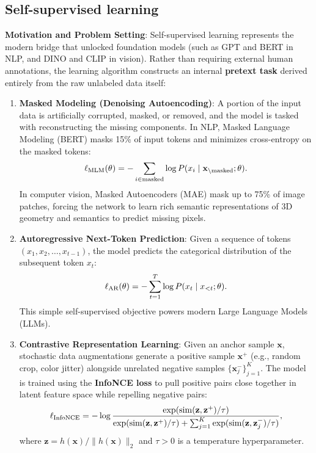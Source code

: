 \subsection{Self-supervised learning}
\label{sec:self_supervised_learning}

\textbf{Motivation and Problem Setting}: Self-supervised learning represents the modern bridge that unlocked foundation models (such as GPT and BERT in NLP, and DINO and CLIP in vision). Rather than requiring external human annotations, the learning algorithm constructs an internal \textbf{pretext task} derived entirely from the raw unlabeled data itself:
\begin{enumerate}
  \item \textbf{Masked Modeling (Denoising Autoencoding)}:
  A portion of the input data is artificially corrupted, masked, or removed, and the model is tasked with reconstructing the missing components. In NLP, Masked Language Modeling (BERT) masks 15\% of input tokens and minimizes cross-entropy on the masked tokens:
  \begin{equation}
  \ell_{\text{MLM}}(\theta) = -\sum_{i \in \text{masked}} \log P(x_i \mid \mathbf{x}_{\setminus \text{masked}}; \theta).
  \end{equation}
  In computer vision, Masked Autoencoders (MAE) mask up to 75\% of image patches, forcing the network to learn rich semantic representations of 3D geometry and semantics to predict missing pixels.
  \item \textbf{Autoregressive Next-Token Prediction}:
  Given a sequence of tokens $(x_1, x_2, \dots, x_{t-1})$, the model predicts the categorical distribution of the subsequent token $x_t$:
  \begin{equation}
  \ell_{\text{AR}}(\theta) = -\sum_{t=1}^T \log P(x_t \mid x_{<t}; \theta).
  \end{equation}
  This simple self-supervised objective powers modern Large Language Models (LLMs).
  \item \textbf{Contrastive Representation Learning}:
  Given an anchor sample $\mathbf{x}$, stochastic data augmentations generate a positive sample $\mathbf{x}^+$ (e.g., random crop, color jitter) alongside unrelated negative samples $\{\mathbf{x}_j^-\}_{j=1}^K$. The model is trained using the \textbf{InfoNCE loss} to pull positive pairs close together in latent feature space while repelling negative pairs:
  \begin{equation}
  \ell_{\text{InfoNCE}} = -\log \frac{\exp(\mathrm{sim}(\mathbf{z}, \mathbf{z}^+) / \tau)}{\exp(\mathrm{sim}(\mathbf{z}, \mathbf{z}^+) / \tau) + \sum_{j=1}^K \exp(\mathrm{sim}(\mathbf{z}, \mathbf{z}_j^-) / \tau)},
  \end{equation}
  where $\mathbf{z} = h(\mathbf{x}) / \|h(\mathbf{x})\|_2$ and $\tau > 0$ is a temperature hyperparameter.
\end{enumerate}

